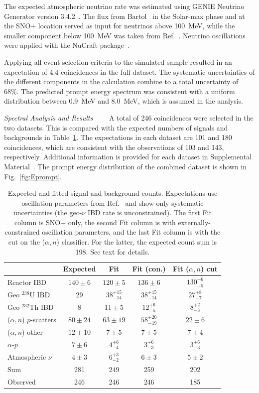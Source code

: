 \documentclass[%
 reprint,
superscriptaddress,
 amsmath,amssymb,
 aps,
]{revtex4-2}
\newcommand{\alphan}{($\alpha, n$) }
\newcommand{\alphap}{$\alpha$-$p$ }
\begin{document}
The expected atmospheric neutrino rate was estimated using GENIE Neutrino Generator version 3.4.2~\cite{atm-genie}. The flux from Bartol~\cite{atm-bartol} in the Solar-max phase and at the SNO+ location served as input for neutrinos above 100~MeV, while the smaller component below 100~MeV was taken from Ref.~\cite{atm-fluka}. Neutrino oscillations were applied with the NuCraft package~\cite{atm-nucraft}. 

Applying all event selection criteria to the simulated sample resulted in an expectation of 4.4 coincidences in the full dataset. The systematic uncertainties of the different components in the calculation combine to a total uncertainty of 68\%. The predicted prompt energy spectrum was consistent with a uniform distribution between 0.9~MeV and 8.0~MeV, which is assumed in the analysis.  


\smallskip
\textit{Spectral Analysis and Results}~~\textemdash~~
A total of 246 coincidences were selected in the two datasets. 
This is compared with the expected numbers of signals and backgrounds in Table~\ref{tab:sum_sig_bkg}.
The expectations in each dataset are 101 and 180 coincidences, which are consistent with the observations of 103 and 143, respectively.  
Additional information is provided for each dataset in Supplemental Material~\cite{supp}.  
The prompt energy distribution of the combined dataset is shown in Fig.~\ref{fig:Eprompt}.

\begin{table}[tbp]\centering
\caption{Expected and fitted signal and background counts.  Expectations use oscillation parameters from Ref.~\cite{PDG2025} and show only systematic uncertainties (the geo-$\nu$ IBD rate is unconstrained). The first Fit column is SNO+ only, the second Fit column is with externally-constrained oscillation parameters, and the last Fit column is with the cut on the \alphan classifier. For the latter, the expected count sum is 198.  See text for details.}\label{tab:sum_sig_bkg}
\begin{tabular}{lcccc}
\toprule
\toprule
   & Expected & Fit & Fit (con.) & Fit \alphan cut \\
\toprule
Reactor IBD & $140\pm6$ & $120\pm5$ & $136\pm6$ & $130_{-5}^{+6}$ \\
Geo $^{238}$U IBD & 29 & $38_{-14}^{+15}$ & $38_{-14}^{+15}$  & $27_{-7}^{+8}$ \\
Geo $^{232}$Th IBD & 8 & $11\pm5$  & $12_{-5}^{+6}$ & $8_{-3}^{+2}$ \\
\alphan $p$-scatters & $80 \pm 24$ & $63\pm19$ & $58_{-19}^{+20}$ & $22\pm6$ \\
\alphan other & $12 \pm 10$ & $7\pm5$ & $7\pm5$ & $7\pm4$ \\ %
\alphap  & $7\pm 6$ & $4_{-4}^{+6}$ & $3_{-3}^{+6}$ & $3_{-3}^{+6}$ \\
Atmospheric $\nu$ & $4\pm 3$ & $6_{-2}^{+3}$ & $6\pm3$ & $5\pm2$ \\
\hline
Sum & 281 & 249 & 259 & 202 \\
\hline
Observed  & 246 & 246 & 246 & 185 \\
\bottomrule
\bottomrule
\end{tabular}
\end{table}
\end{document}
